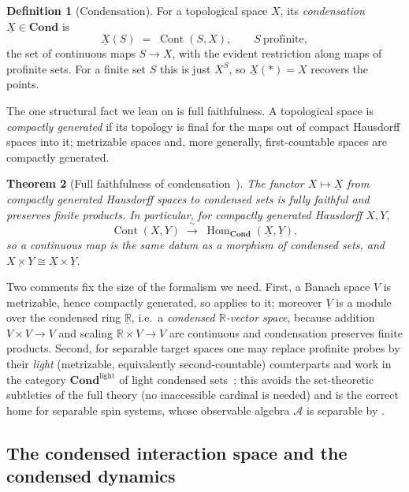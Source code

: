 \documentclass[12pt]{article}
\newcommand{\cond}[1]{\underline{#1}}          %
\newcommand{\Cont}{\operatorname{Cont}}        %
\newcommand{\qA}{\mathcal{A}}
\newcommand{\R}{\mathbb{R}}
\newcommand{\Set}{\mathbf{Cond}}
\newcommand{\lCond}{\mathbf{Cond}^{\mathrm{light}}}
\newtheorem{theorem}{Theorem}[section]
\theoremstyle{definition}
\newtheorem{definition}[theorem]{Definition}
\theoremstyle{remark}
\begin{document}
\begin{definition}[Condensation]
\label{def:condensation}
For a topological space $X$, its \emph{condensation} $\cond{X}\in\Set$ is
\[
  \cond{X}(S)\;=\;\Cont(S,X),\qquad S\ \text{profinite},
\]
the set of continuous maps $S\to X$, with the evident restriction along maps of profinite
sets. For a finite set $S$ this is just $X^{S}$, so $\cond{X}(\ast)=X$ recovers the points.
\end{definition}

The one structural fact we lean on is full faithfulness. A topological space is
\emph{compactly generated} if its topology is final for the maps out of compact Hausdorff
spaces into it; metrizable spaces and, more generally, first-countable spaces are compactly
generated.

\begin{theorem}[Full faithfulness of condensation~\cite{clausen-scholze-condensed}]
\label{thm:full-faithful}
The functor $X\mapsto\cond{X}$ from compactly generated Hausdorff spaces to condensed sets is
fully faithful and preserves finite products. In particular, for compactly generated
Hausdorff $X,Y$,
\[
  \Cont(X,Y)\;\xrightarrow{\ \sim\ }\;\operatorname{Hom}_{\Set}(\cond{X},\cond{Y}),
\]
so a continuous map is the same datum as a morphism of condensed sets, and
$\cond{X\times Y}\cong\cond{X}\times\cond{Y}$.
\end{theorem}

Two comments fix the size of the formalism we need. First, a Banach space $V$ is metrizable,
hence compactly generated, so  applies to it; moreover $\cond{V}$ is
a module over the condensed ring $\cond{\R}$, i.e.\ a \emph{condensed $\R$-vector space},
because addition $V\times V\to V$ and scaling $\R\times V\to V$ are continuous and condensation
preserves finite products. Second, for separable target spaces one may replace profinite
probes by their \emph{light} (metrizable, equivalently second-countable) counterparts and work
in the category $\lCond$ of light condensed sets~\cite{clausen-scholze-analytic-stacks}; this
avoids the set-theoretic subtleties of the full theory (no inaccessible cardinal is needed)
and is the correct home for separable spin systems, whose observable algebra $\qA$ is
separable by .

\subsection{The condensed interaction space and the condensed dynamics}
\label{sec:condensation-main}
\end{document}
